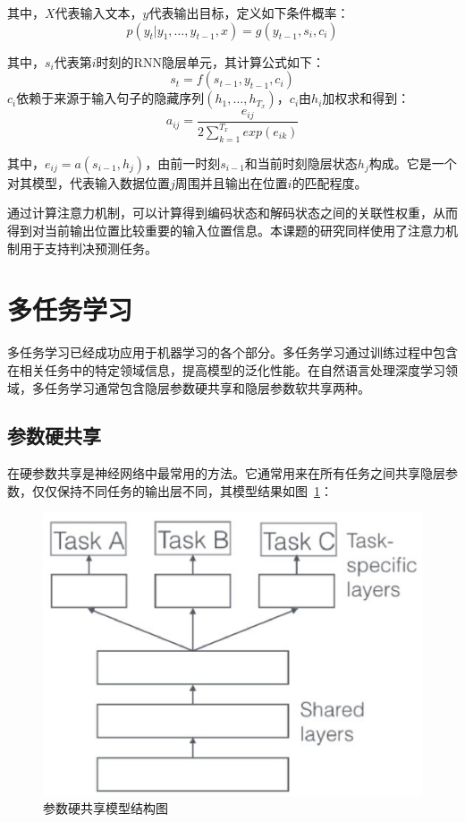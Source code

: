 其中，$X$代表输入文本，$y$代表输出目标，定义如下条件概率：
\begin{equation}
    p(y_t|y_1, \dots, y_{t-1},x) = g(y_{t-1},s_i,c_i)
\end{equation}

其中，$s_i$代表第$i$时刻的RNN隐层单元，其计算公式如下：
\begin{equation}
    s_t= f(s_{t-1},y_{t-1},c_i)
\end{equation}
$c_i$依赖于来源于输入句子的隐藏序列$(h_1,\dots,h_{T_x})$，$c_i$由$h_i$加权求和得到：
\begin{equation}
a_{ij} = \frac{e_{ij}}{2\sum_{k=1}^{T_x}exp(e_{ik})}
\end{equation}

其中，$e_{ij}=a(s_{i-1},h_j)$，由前一时刻$s_{i-1}$和当前时刻隐层状态$h_j$构成。它是一个对其模型，代表输入数据位置$j$周围并且输出在位置$i$的匹配程度。

通过计算注意力机制，可以计算得到编码状态和解码状态之间的关联性权重，从而得到对当前输出位置比较重要的输入位置信息。本课题的研究同样使用了注意力机制用于支持判决预测任务。

\section{多任务学习}

多任务学习已经成功应用于机器学习的各个部分。多任务学习通过训练过程中包含在相关任务中的特定领域信息，提高模型的泛化性能。在自然语言处理深度学习领域，多任务学习通常包含隐层参数硬共享和隐层参数软共享两种。

\subsection{参数硬共享}
在硬参数共享是神经网络中最常用的方法。它通常用来在所有任务之间共享隐层参数，仅仅保持不同任务的输出层不同，其模型结果如图~\ref{fig:hard_share}：

\begin{figure}[t!]
    \centering
    \includegraphics[scale=0.5, clip=true]{./sources/hard_share.eps}
    \vspace{-10pt}
    \caption{\label{fig:hard_share} 参数硬共享模型结构图}
    \vspace{-5pt}
\end{figure}


